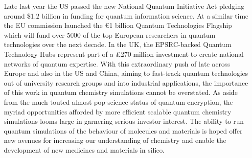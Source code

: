 \documentclass[12pt]{article}
\begin{document}
Late last year the US passed the new National Quantum Initiative Act pledging around \$1.2 billion in funding for quantum information science. At a similar time the EU commission launched the €1 billion Quantum Technologies Flagship which will fund over 5000 of the top European researchers in quantum technologies over the next decade. In the UK, the EPSRC-backed Quantum Technology Hubs represent part of a £270 million investment to create national networks of quantum expertise. With this extraordinary push of late across Europe and also in the US and China, aiming to fast-track quantum technologies out of university research groups and into industrial applications, the importance of this work in quantum chemistry simulations cannot be overstated. As aside from the much touted almost pop-science status of quantum encryption, the myriad opportunities afforded by more efficient scalable quantum chemistry simulations looms large in garnering serious investor interest. The ability to run quantum simulations of the behaviour of molecules and materials is hoped offer new avenues for increasing our understanding of chemistry and enable the development of new medicines and materials in silico.


\end{document}
